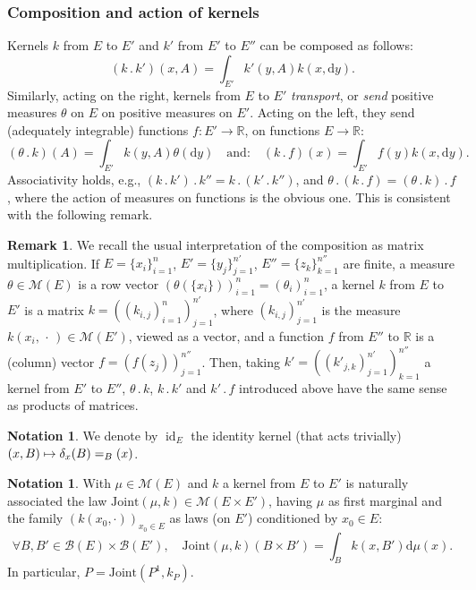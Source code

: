 \documentclass[11pt]{article}
\makeatletter
\newcommand{\ldot}{\mathbin{.}}
\newcommand\mto{\mathchoice{\longmapsto}{\mapsto}{\mapsto}{\mapsto}}
\DeclareRobustCommand{\mathbbm}[1]{\csname jepbb@#1\endcsname}
\theoremstyle{plain}
\theoremstyle{definition}
\newtheorem{notation}[them]{Notation} %
\newtheorem{rem}[them]{Remark}
\newcommand{\dd}{\mathrm{d}}
\newcommand{\join}{\mathrm{Joint}}
\newcommand{\idk}{\operatorname{id}}
\newcommand{\espace}{E}
\newcommand{\one}{\mathbbm{1}}
\newcommand{\m}{\mathcal{M}}
\newcommand{\R}{\mathbb{R}}
\makeatother
\begin{document}
\subsubsection{Composition and action of kernels}\label{ss:compos} Kernels $k$ from $E$ to $E'$ and $k'$ from $E'$ to $E''$ can be composed as follows:\vspace*{-3pt}
\[(k\ldot k')(x,A)=\int_{E'} k'(y,A) k(x,\dd y).\]
Similarly, acting on the right, kernels from $E$ to $E'$ \emph{transport}, or \emph{send} positive measures $\theta$ on $E$ on positive measures on $E'$. Acting on the left, they send (adequately integrable) functions $f:E'\to \R$, on functions $E\to \R$:\vspace*{-3pt}
\[(\theta\ldot k)(A)=\int_{E'}k(y,A)\theta(\dd y)\quad \text{and:}\quad (k\ldot f)(x)=\int_{E'} f(y) k(x,\dd y).\]
\noindent Associativity holds, e.g., $(k\ldot k')\ldot k''=k\ldot(k'\ldot k'')$, and $\theta\ldot(k\ldot f)=(\theta\ldot k)\ldot f$, where the action of measures on functions is the obvious one. This is consistent with the following remark.

\begin{rem}\label{rem:matrix}
We recall the usual interpretation of the composition as matrix multiplication. If $E=\{x_i\}_{i=1}^{n}$, $E'=\{y_j\}_{j=1}^{n'}$, $E''=\{z_k\}_{k=1}^{n''}$ are finite, a measure $\theta\in\m(E)$ is a row vector $(\theta(\{x_i\}))_{i=1}^{n}=(\theta_i)_{i=1}^{n}$, a kernel $k$ from $E$ to $E'$ is a matrix $k=((k_{i,j})_{i=1}^{n})_{j=1}^{n'}$, where $(k_{i,j})_{j=1}^{n'}$ is the measure $k(x_i,\,\cdot\,)\in\m(E')$, viewed as a vector, and a function $f$ from $E''$ to $\R$ is a (column) vector $f=(f(z_j))_{j=1}^{n''}$. Then, taking $k'=((k'_{j,k})_{j=1}^{n'})_{k=1}^{n''}$ a kernel from $E'$ to $E''$, $\theta\ldot k$, $k\ldot k'$ and $k'\ldot f$ introduced above have the same sense as products of matrices.
\end{rem}

\begin{notation}\label{not:ident} We denote by $\idk_E$ the identity kernel (that acts trivially) $(x,B)\mto\delta_x(B)=\one_B(x)$.
\end{notation}

\begin{notation}\label{notation_join} With $\mu\in\m(E)$ and $k$ a kernel from $E$ to $E'$ is naturally associated the law $\join(\mu,k)\in\m(\espace\times \espace')$, having $\mu$ as first marginal and the family $(k(x_0,\cdot))_{x_0\in E}$ as laws (on $E'$) conditioned by $x_0\in E$:\vspace*{-3pt}
\[\forall B,B'\in{\mathcal B}(E)\times{\mathcal B}(E'),\quad \join(\mu,k)(B\times B')=\int_Bk(x,B')\dd\mu(x).\]
In particular, $P=\join(P^1,k_P)$.
\end{notation}
\end{document}
